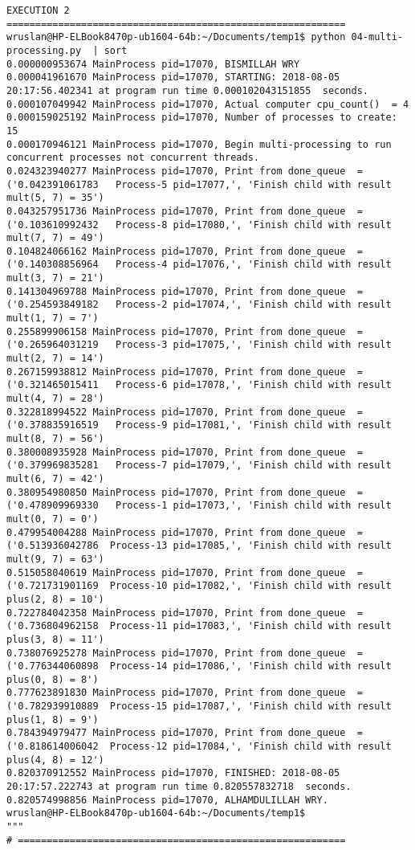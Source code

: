 \begin{lstlisting}[caption={App4-Python Parallel Multiprocessing Codes}, label=App4-Python Parallel Multiprocessing Codes]
EXECUTION 2
===========================================================
wruslan@HP-ELBook8470p-ub1604-64b:~/Documents/temp1$ python 04-multi-processing.py  | sort
0.000000953674 MainProcess pid=17070, BISMILLAH WRY
0.000041961670 MainProcess pid=17070, STARTING: 2018-08-05 20:17:56.402341 at program run time 0.000102043151855  seconds.
0.000107049942 MainProcess pid=17070, Actual computer cpu_count()  = 4 
0.000159025192 MainProcess pid=17070, Number of processes to create: 15
0.000170946121 MainProcess pid=17070, Begin multi-processing to run concurrent processes not concurrent threads.
0.024323940277 MainProcess pid=17070, Print from done_queue  =  ('0.042391061783   Process-5 pid=17077,', 'Finish child with result mult(5, 7) = 35')
0.043257951736 MainProcess pid=17070, Print from done_queue  =  ('0.103610992432   Process-8 pid=17080,', 'Finish child with result mult(7, 7) = 49')
0.104824066162 MainProcess pid=17070, Print from done_queue  =  ('0.140308856964   Process-4 pid=17076,', 'Finish child with result mult(3, 7) = 21')
0.141304969788 MainProcess pid=17070, Print from done_queue  =  ('0.254593849182   Process-2 pid=17074,', 'Finish child with result mult(1, 7) = 7')
0.255899906158 MainProcess pid=17070, Print from done_queue  =  ('0.265964031219   Process-3 pid=17075,', 'Finish child with result mult(2, 7) = 14')
0.267159938812 MainProcess pid=17070, Print from done_queue  =  ('0.321465015411   Process-6 pid=17078,', 'Finish child with result mult(4, 7) = 28')
0.322818994522 MainProcess pid=17070, Print from done_queue  =  ('0.378835916519   Process-9 pid=17081,', 'Finish child with result mult(8, 7) = 56')
0.380008935928 MainProcess pid=17070, Print from done_queue  =  ('0.379969835281   Process-7 pid=17079,', 'Finish child with result mult(6, 7) = 42')
0.380954980850 MainProcess pid=17070, Print from done_queue  =  ('0.478909969330   Process-1 pid=17073,', 'Finish child with result mult(0, 7) = 0')
0.479954004288 MainProcess pid=17070, Print from done_queue  =  ('0.513936042786  Process-13 pid=17085,', 'Finish child with result mult(9, 7) = 63')
0.515058040619 MainProcess pid=17070, Print from done_queue  =  ('0.721731901169  Process-10 pid=17082,', 'Finish child with result plus(2, 8) = 10')
0.722784042358 MainProcess pid=17070, Print from done_queue  =  ('0.736804962158  Process-11 pid=17083,', 'Finish child with result plus(3, 8) = 11')
0.738076925278 MainProcess pid=17070, Print from done_queue  =  ('0.776344060898  Process-14 pid=17086,', 'Finish child with result plus(0, 8) = 8')
0.777623891830 MainProcess pid=17070, Print from done_queue  =  ('0.782939910889  Process-15 pid=17087,', 'Finish child with result plus(1, 8) = 9')
0.784394979477 MainProcess pid=17070, Print from done_queue  =  ('0.818614006042  Process-12 pid=17084,', 'Finish child with result plus(4, 8) = 12')
0.820370912552 MainProcess pid=17070, FINISHED: 2018-08-05 20:17:57.222743 at program run time 0.820557832718  seconds.
0.820574998856 MainProcess pid=17070, ALHAMDULILLAH WRY.
wruslan@HP-ELBook8470p-ub1604-64b:~/Documents/temp1$ 
"""
# =========================================================
\end{lstlisting}

